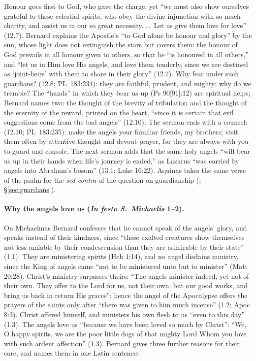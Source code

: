 Honour goes first to God, who gave the charge; yet ``we must also show
ourselves grateful to these celestial spirits, who obey the divine
injunction with so much charity, and assist us in our so great necessity.
\dots\ Let us give them love for love'' (12.7). Bernard explains the
Apostle's ``to God alone be honour and glory'' by the sun, whose light does
not extinguish the stars but covers them: the honour of God prevails in all
honour given to others, so that he ``is honoured in all others,'' and ``let
us in Him love His angels, and love them tenderly, since we are destined as
`joint-heirs' with them to share in their glory'' (12.7). Why fear under
such guardians?  (12.8; PL~183:234): they are faithful, prudent, and mighty;
why do we tremble? The ``hands'' in which they bear us up (Ps 90[91]:12)
are spiritual helps; Bernard names two: the thought of the brevity of
tribulation and the thought of the eternity of the reward, printed on the
heart, ``since it is certain that evil suggestions come from the bad
angels'' (12.10). The sermon ends with a counsel:  (12.10;
PL~183:235): make the angels your familiar friends, my brothers; visit them
often by attentive thought and devout prayer, for they are always with you
to guard and console. The next sermon adds that the same holy angels ``will
bear us up in their hands when life's journey is ended,'' as Lazarus ``was
carried by angels into Abraham's bosom'' (13.1; Luke 16:22). Aquinas takes
the same verse of the psalm for the \emph{sed contra} of the question on
guardianship (; \S\ref{sec:guardians}).

\paragraph{Why the angels love us (\emph{In festo S.\ Michaelis} 1--2).} On
Michaelmas Bernard confesses that he cannot speak of the angels' glory, and
speaks instead of their kindness, since ``these exalted creatures show
themselves not less amiable by their condescension than they are admirable
by their state'' (1.1). They are ministering spirits (Heb 1:14), and no
angel disdains ministry, since the King of angels came ``not to be
ministered unto but to minister'' (Matt 20:28). Christ's ministry surpasses
theirs: ``The angels minister indeed, yet not of their own. They offer to
the Lord for us, not their own, but our good works, and bring us back in
return His graces''; hence the angel of the Apocalypse offers the prayers
of the saints only after ``there was given to him much incense'' (1.2; Apoc
8:3). Christ offered himself, and ministers his own flesh to us ``even to
this day'' (1.3). The angels love us ``because we have been loved so much by
Christ'': ``We, O happy spirits, we are the poor little dogs of that mighty
Lord Whom you love with such ardent affection'' (1.3). Bernard gives three
further reasons for their care, and names them in one Latin sentence:

